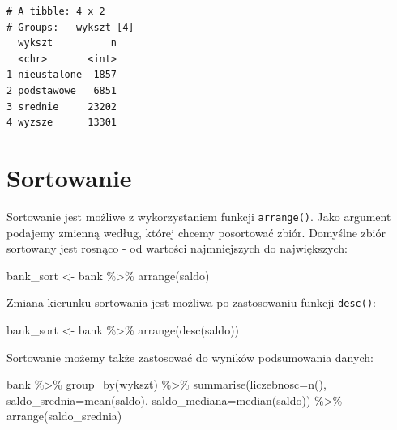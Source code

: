\documentclass[
  letterpaper,
  DIV=11,
  numbers=noendperiod]{scrreprt}
\newenvironment{Shaded}{\begin{snugshade}}{\end{snugshade}}
\newcommand{\AttributeTok}[1]{\textcolor[rgb]{0.40,0.45,0.13}{#1}}
\newcommand{\FunctionTok}[1]{\textcolor[rgb]{0.28,0.35,0.67}{#1}}
\newcommand{\NormalTok}[1]{\textcolor[rgb]{0.00,0.23,0.31}{#1}}
\newcommand{\OtherTok}[1]{\textcolor[rgb]{0.00,0.23,0.31}{#1}}
\newcommand{\SpecialCharTok}[1]{\textcolor[rgb]{0.37,0.37,0.37}{#1}}
\begin{document}
\begin{verbatim}
# A tibble: 4 x 2
# Groups:   wykszt [4]
  wykszt          n
  <chr>       <int>
1 nieustalone  1857
2 podstawowe   6851
3 srednie     23202
4 wyzsze      13301
\end{verbatim}

\hypertarget{sortowanie}{%
\section{Sortowanie}\label{sortowanie}}

Sortowanie jest możliwe z wykorzystaniem funkcji \texttt{arrange()}.
Jako argument podajemy zmienną według, której chcemy posortować zbiór.
Domyślne zbiór sortowany jest rosnąco - od wartości najmniejszych do
największych:

\begin{Shaded}
\begin{Highlighting}[]
\NormalTok{bank\_sort }\OtherTok{\textless{}{-}}\NormalTok{ bank }\SpecialCharTok{\%\textgreater{}\%}
  \FunctionTok{arrange}\NormalTok{(saldo)}
\end{Highlighting}
\end{Shaded}

Zmiana kierunku sortowania jest możliwa po zastosowaniu funkcji
\texttt{desc()}:

\begin{Shaded}
\begin{Highlighting}[]
\NormalTok{bank\_sort }\OtherTok{\textless{}{-}}\NormalTok{ bank }\SpecialCharTok{\%\textgreater{}\%}
  \FunctionTok{arrange}\NormalTok{(}\FunctionTok{desc}\NormalTok{(saldo))}
\end{Highlighting}
\end{Shaded}

Sortowanie możemy także zastosować do wyników podsumowania danych:

\begin{Shaded}
\begin{Highlighting}[]
\NormalTok{bank }\SpecialCharTok{\%\textgreater{}\%}
  \FunctionTok{group\_by}\NormalTok{(wykszt) }\SpecialCharTok{\%\textgreater{}\%}
  \FunctionTok{summarise}\NormalTok{(}\AttributeTok{liczebnosc=}\FunctionTok{n}\NormalTok{(),}
            \AttributeTok{saldo\_srednia=}\FunctionTok{mean}\NormalTok{(saldo),}
            \AttributeTok{saldo\_mediana=}\FunctionTok{median}\NormalTok{(saldo)) }\SpecialCharTok{\%\textgreater{}\%}
  \FunctionTok{arrange}\NormalTok{(saldo\_srednia)}
\end{Highlighting}
\end{Shaded}
\end{document}
